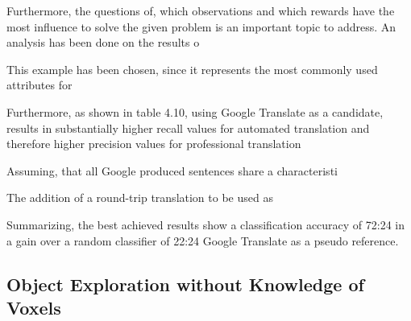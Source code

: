           
        

        Furthermore, the questions of, which observations and which rewards have the most inﬂuence to solve the given problem
        is an important topic to address. An analysis has been done on the results o
        
        This example has been chosen, since it represents the most commonly used attributes for
        
        Furthermore, as shown in table 4.10, using Google Translate as a candidate, results in
        substantially higher recall values for automated translation and therefore higher precision
        values for professional translation
        
        Assuming, that all Google produced sentences share a characteristi
        
        The addition of a round-trip translation to be used as 
        
        Summarizing, the best achieved results show a classiﬁcation accuracy of 72:24%
        in a gain over a random classiﬁer of 22:24%
        Google Translate as a pseudo reference.
    

    \subsection{Object Exploration without Knowledge of Voxels}
        
